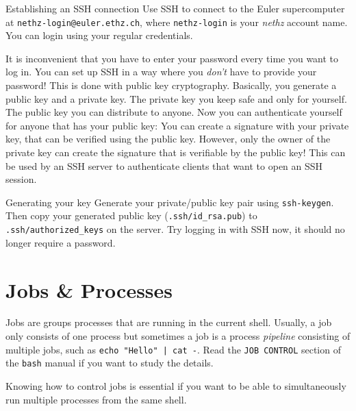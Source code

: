 \documentclass{TheAlternativeCourse}
\begin{document}

\begin{exercisebox}{Establishing an SSH connection}
    Use SSH to connect to the Euler supercomputer at
    \texttt{nethz-login@euler.ethz.ch}, where \texttt{nethz-login} is your
    \emph{nethz} account name. You can login using your regular credentials.
\end{exercisebox}
%
It is inconvenient that you have to enter your password every time you want to
log in. You can set up SSH in a way where you \emph{don't} have to provide your
password!  This is done with public key cryptography. Basically, you generate a
public key and a private key.  The private key you keep safe and only for
yourself. The public key you can distribute to anyone.  Now you can
authenticate yourself for anyone that has your public key: You can create a
signature with your private key, that can be verified using the public key.
However, only the owner of the private key can create the signature that is
verifiable by the public key! This can be used by an SSH server to authenticate
clients that want to open an SSH session.

\begin{exercisebox}{Generating your key}
    Generate your private/public key pair using \texttt{ssh-keygen}.
    Then copy your generated public key (\texttt{.ssh/id\_rsa.pub}) to
    \texttt{.ssh/authorized\_keys} on the server. Try logging in with SSH now,
    it should no longer require a password.
\end{exercisebox}

	
\section{Jobs \& Processes}

Jobs are groups processes that are running in the current shell. Usually, a job only consists of one process but sometimes a job is a process \emph{pipeline} consisting of multiple jobs, such as \texttt{echo "Hello" | cat -}. Read the \texttt{JOB CONTROL} section of the \texttt{bash} manual if you want to study the details.

Knowing how to control jobs is essential if you want to be able to simultaneously run multiple processes from the same shell.
\end{document}

